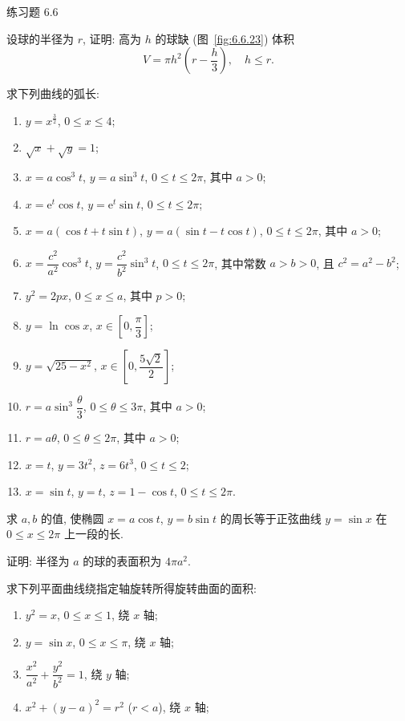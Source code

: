 \begin{exblock}{练习题 6.6}
\[\]
\item 设球的半径为 $r$, 证明: 高为 $h$ 的球缺 (图~\ref{fig:6.6.23}) 体积
\[
V=\pi h^{2}\left(r-\frac{h}{3}\right),\quad h\leqslant r.
\]
\item 求下列曲线的弧长:
\begin{enumerate}[label=(\arabic*)]
\item $y=x^{\frac{3}{2}}$, $0\leqslant x\leqslant4$;
\item $\sqrt{x}+\sqrt{y}=1$;
\item $x=a\cos^{3}t$, $y=a\sin^{3}t$, $0\leqslant t\leqslant2\pi$, 其中 $a>0$;
\item $x=\mathrm{e}^{t}\cos t$, $y=\mathrm{e}^{t}\sin t$, $0\leqslant t\leqslant2\pi$;
\item $x=a(\cos t+t\sin t)$, $y=a(\sin t-t\cos t)$, $0\leqslant t\leqslant2\pi$, 其中 $a>0$;
\item $x=\dfrac{c^{2}}{a^{2}}\cos^{3}t$, $y=\dfrac{c^{2}}{b^{2}}\sin^{3}t$, $0\leqslant t\leqslant2\pi$, 其中常数 $a>b>0$, 且 $c^{2}=a^{2}-b^{2}$;
\item $y^{2}=2px$, $0\leqslant x\leqslant a$, 其中 $p>0$;
\item $y=\ln\cos x$, $x\in\left[0,\dfrac{\pi}{3}\right]$;
\item $y=\sqrt{25-x^{2}}$, $x\in\left[0,\dfrac{5\sqrt{2}}{2}\right]$;
\item $r=a\sin^{3}\dfrac{\theta}{3}$, $0\leqslant\theta\leqslant3\pi$, 其中 $a>0$;
\item $r=a\theta$, $0\leqslant\theta\leqslant2\pi$, 其中 $a>0$;
\item $x=t$, $y=3t^{2}$, $z=6t^{3}$, $0\leqslant t\leqslant2$;
\item $x=\sin t$, $y=t$, $z=1-\cos t$, $0\leqslant t\leqslant2\pi$.
\end{enumerate}
\item 求 $a,b$ 的值, 使椭圆 $x=a\cos t$, $y=b\sin t$ 的周长等于正弦曲线 $y=\sin x$ 在 $0\leqslant x\leqslant2\pi$ 上一段的长.
\item 证明: 半径为 $a$ 的球的表面积为 $4\pi a^{2}$.
\item 求下列平面曲线绕指定轴旋转所得旋转曲面的面积:
\begin{enumerate}[label=(\arabic*)]
\item $y^{2}=x$, $0\leqslant x\leqslant1$, 绕 $x$ 轴;
\item $y=\sin x$, $0\leqslant x\leqslant\pi$, 绕 $x$ 轴;
\item $\dfrac{x^{2}}{a^{2}}+\dfrac{y^{2}}{b^{2}}=1$, 绕 $y$ 轴;
\item $x^{2}+(y-a)^{2}=r^{2}$ ($r<a$), 绕 $x$ 轴;

\end{enumerate}
\end{exblock}

